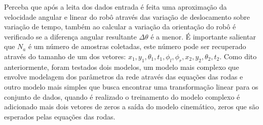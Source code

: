 Perceba que após a leita dos dados entrada é feita uma aproximação da
velocidade angular e linear do robô através das variação de deslocamento
sobre variação de tempo, também ao calcular a variação da orientação do robô
é verificado se a diferença angular resultante $\Delta \theta$ é a menor.
 É importante salientar que $N_a$
é um número de amostras coletadas, este número pode ser recuperado através
do tamanho de um dos vetores: $x_1,y_1,\theta_{1},t_1,\phi_l,\phi_r,x_2,y_2,\theta_{2},t_2$.
Como dito anteriormente, foram testados dois modelos, um modelo mais complexo
que envolve modelagem dos parâmetros da rede através das equações das rodas
e outro modelo mais simples que busca encontrar uma transformação linear
para os conjunto de dados, quando é realizado o treinamento do modelo complexo
é adicionado mais dois vetores de zeros a saída do modelo cinemático, zeros
que são esperados pelas equações das rodas. 